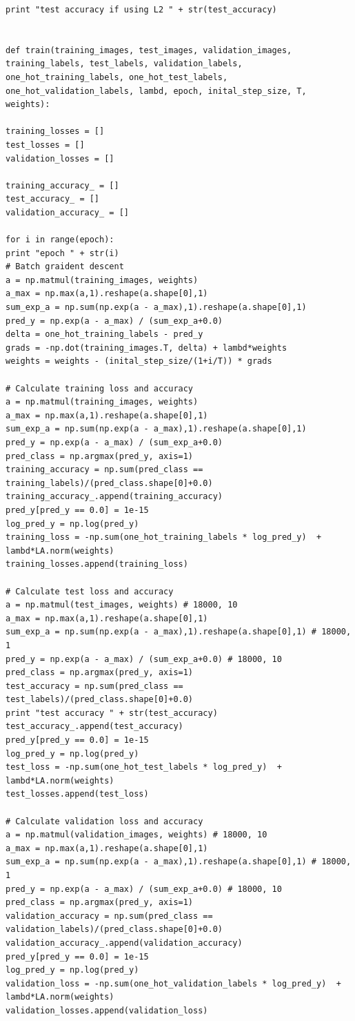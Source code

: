 \documentclass{article} %
\begin{document}
\begin{lstlisting}
print "test accuracy if using L2 " + str(test_accuracy) 


def train(training_images, test_images, validation_images, training_labels, test_labels, validation_labels, one_hot_training_labels, one_hot_test_labels, one_hot_validation_labels, lambd, epoch, inital_step_size, T, weights):

training_losses = []
test_losses = []
validation_losses = []

training_accuracy_ = []
test_accuracy_ = []
validation_accuracy_ = []

for i in range(epoch):
print "epoch " + str(i)
# Batch graident descent
a = np.matmul(training_images, weights) 
a_max = np.max(a,1).reshape(a.shape[0],1)
sum_exp_a = np.sum(np.exp(a - a_max),1).reshape(a.shape[0],1) 
pred_y = np.exp(a - a_max) / (sum_exp_a+0.0) 
delta = one_hot_training_labels - pred_y 
grads = -np.dot(training_images.T, delta) + lambd*weights
weights = weights - (inital_step_size/(1+i/T)) * grads

# Calculate training loss and accuracy
a = np.matmul(training_images, weights) 
a_max = np.max(a,1).reshape(a.shape[0],1)
sum_exp_a = np.sum(np.exp(a - a_max),1).reshape(a.shape[0],1) 
pred_y = np.exp(a - a_max) / (sum_exp_a+0.0) 
pred_class = np.argmax(pred_y, axis=1)
training_accuracy = np.sum(pred_class == training_labels)/(pred_class.shape[0]+0.0)
training_accuracy_.append(training_accuracy)
pred_y[pred_y == 0.0] = 1e-15
log_pred_y = np.log(pred_y)
training_loss = -np.sum(one_hot_training_labels * log_pred_y)  + lambd*LA.norm(weights)
training_losses.append(training_loss)

# Calculate test loss and accuracy
a = np.matmul(test_images, weights) # 18000, 10
a_max = np.max(a,1).reshape(a.shape[0],1)
sum_exp_a = np.sum(np.exp(a - a_max),1).reshape(a.shape[0],1) # 18000, 1
pred_y = np.exp(a - a_max) / (sum_exp_a+0.0) # 18000, 10
pred_class = np.argmax(pred_y, axis=1)
test_accuracy = np.sum(pred_class == test_labels)/(pred_class.shape[0]+0.0)
print "test accuracy " + str(test_accuracy)
test_accuracy_.append(test_accuracy)
pred_y[pred_y == 0.0] = 1e-15
log_pred_y = np.log(pred_y)
test_loss = -np.sum(one_hot_test_labels * log_pred_y)  +  lambd*LA.norm(weights)
test_losses.append(test_loss)

# Calculate validation loss and accuracy
a = np.matmul(validation_images, weights) # 18000, 10
a_max = np.max(a,1).reshape(a.shape[0],1)
sum_exp_a = np.sum(np.exp(a - a_max),1).reshape(a.shape[0],1) # 18000, 1
pred_y = np.exp(a - a_max) / (sum_exp_a+0.0) # 18000, 10
pred_class = np.argmax(pred_y, axis=1)
validation_accuracy = np.sum(pred_class == validation_labels)/(pred_class.shape[0]+0.0) 
validation_accuracy_.append(validation_accuracy)
pred_y[pred_y == 0.0] = 1e-15
log_pred_y = np.log(pred_y)
validation_loss = -np.sum(one_hot_validation_labels * log_pred_y)  +  lambd*LA.norm(weights)
validation_losses.append(validation_loss) 



\end{lstlisting}
\end{document}

